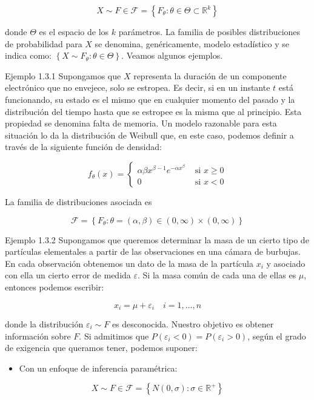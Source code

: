 \documentclass[
]{article}
\providecommand{\tightlist}{%
  \setlength{\itemsep}{0pt}\setlength{\parskip}{0pt}}
\begin{document}
\[
X \sim F \in \mathcal{F}=\left\{F_{\theta}: \theta \in \Theta \subset \mathbb{R}^{k}\right\}
\]

donde \(\Theta\) es el espacio de los \(k\) parámetros.
La familia de posibles distribuciones de probabilidad para \(X\) se denomina, genéricamente, modelo estadístico y se indica como: \(\left\{X \sim F_{\theta}: \theta \in \Theta\right\}\). Veamos algunos ejemplos.

Ejemplo 1.3.1 Supongamos que \(X\) representa la duración de un componente electrónico que no envejece, solo se estropea. Es decir, si en un instante \(t\) está funcionando, su estado es el mismo que en cualquier momento del pasado y la distribución del tiempo hasta que se estropee es la misma que al principio. Esta propiedad se denomina falta de memoria.
Un modelo razonable para esta situación lo da la distribución de Weibull que, en este caso, podemos definir a través de la siguiente función de densidad:

\[
f_{\theta}(x)= \begin{cases}\alpha \beta x^{\beta-1} e^{-\alpha x^{\beta}} & \text { si } x \geq 0 \\ 0 & \text { si } x<0\end{cases}
\]

La familia de distribuciones asociada es

\[
\mathcal{F}=\left\{F_{\theta}: \theta=(\alpha, \beta) \in(0, \infty) \times(0, \infty)\right\}
\]

Ejemplo 1.3.2 Supongamos que queremos determinar la masa de un cierto tipo de partículas elementales a partir de las observaciones en una cámara de burbujas. En cada observación obtenemos un dato de la masa de la partícula \(x_{i}\) y asociado con ella un cierto error de medida \(\varepsilon\). Si la masa común de cada una de ellas es \(\mu\), entonces podemos escribir:

\[
x_{i}=\mu+\varepsilon_{i} \quad i=1, \ldots, n
\]

donde la distribución \(\varepsilon_{i} \sim F\) es desconocida. Nuestro objetivo es obtener información sobre \(F\).
Si admitimos que \(P\left(\varepsilon_{i}<0\right)=P\left(\varepsilon_{i}>0\right)\), según el grado de exigencia que queramos tener, podemos suponer:

\begin{itemize}
\tightlist
\item
  Con un enfoque de inferencia paramétrica:
\end{itemize}

\[
X \sim F \in \mathcal{F}=\left\{N(0, \sigma): \sigma \in \mathbb{R}^{+}\right\}
\]
\end{document}
